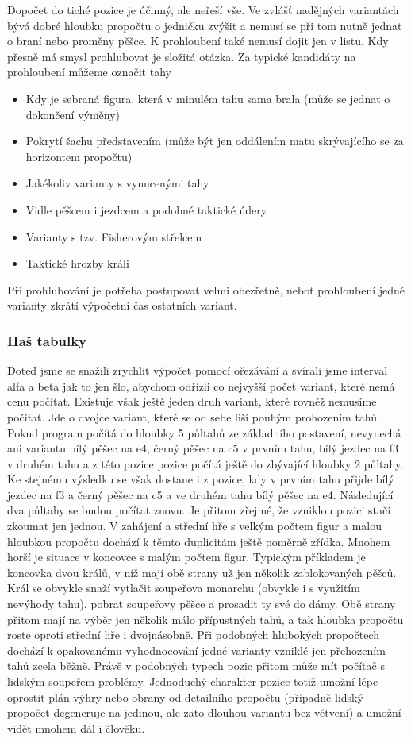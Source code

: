 \documentclass[11pt, titlepage]{article}
\begin{document}
Dopočet do tiché pozice je účinný, ale neřeší vše. Ve zvlášť nadějných variantách bývá dobré hloubku propočtu o jedničku zvýšit a nemusí se při tom nutně jednat o braní nebo proměny pěšce. K prohloubení také nemusí dojit jen v listu. Kdy přesně má smysl prohlubovat je složitá otázka. Za typické kandidáty na prohloubení můžeme označit tahy
\begin{itemize}
	\item Kdy je sebraná figura, která v minulém tahu sama brala (může se jednat o dokončení výměny)
	\item Pokrytí šachu představením (může být jen oddálením matu skrývajícího se za horizontem propočtu)
	\item Jakékoliv varianty s vynucenými tahy
	\item Vidle pěšcem i jezdcem a podobné taktické údery
	\item Varianty s tzv. Fisherovým střelcem
	\item Taktické hrozby králi
\end{itemize}
Při prohlubování je potřeba postupovat velmi obezřetně, neboť prohloubení jedné varianty zkrátí výpočetní čas ostatních variant.

\subsubsection{Haš tabulky}

Doteď jsme se snažili zrychlit výpočet pomocí ořezávání a svírali jsme interval alfa a beta jak to jen šlo, abychom odřízli co nejvyšší počet variant, které nemá cenu počítat. Existuje však ještě jeden druh variant, které rovněž nemusíme počítat. Jde o dvojce variant, které se od sebe liší pouhým prohozením tahů. Pokud program počítá do hloubky 5 půltahů ze základního postavení, nevynechá ani variantu bílý pěšec na e4, černý pěšec na c5 v prvním tahu, bílý jezdec na f3 v druhém tahu a z této pozice pozice počítá ještě do zbývající hloubky 2 půltahy. Ke stejnému výsledku se však dostane i z pozice, kdy v prvním tahu přijde bílý jezdec na f3 a černý pěšec na c5 a ve druhém tahu bílý pěšec na e4. Následující dva půltahy se budou počítat znovu. Je přitom zřejmé, že vzniklou pozici stačí zkoumat jen jednou.
V zahájení a střední hře s velkým počtem figur a malou hloubkou propočtu dochází k těmto duplicitám ještě poměrně zřídka. Mnohem horší je situace v koncovce s malým počtem figur. Typickým příkladem je koncovka dvou králů, v níž mají obě strany už jen několik zablokovaných pěšců. Král se obvykle snaží vytlačit soupeřova monarchu (obvykle i s využitím nevýhody tahu), pobrat soupeřovy pěšce a prosadit ty své do dámy. Obě strany přitom mají na výběr jen několik málo přípustných tahů, a tak hloubka propočtu roste oproti střední hře i dvojnásobně. Při podobných hlubokých propočtech dochází k opakovanému vyhodnocování jedné varianty vzniklé jen přehozením tahů zcela běžně. Právě v podobných typech pozic přitom může mít počítač s lidským soupeřem problémy. Jednoduchý charakter pozice totiž umožní lépe oprostit plán výhry nebo obrany od detailního propočtu (případně lidský propočet degeneruje na jedinou, ale zato dlouhou variantu bez větvení) a umožní vidět mnohem dál i člověku.
\end{document}

